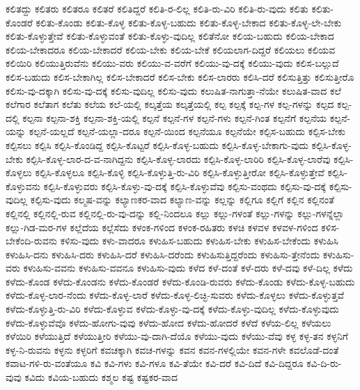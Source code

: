 {ಕಲಿತದ್ದು
ಕಲಿತರು
ಕಲಿತರೂ
ಕಲಿತರೆ
ಕಲಿತಿದ್ದರೆ
ಕಲಿತಿ-ರ-ಲಿಲ್ಲ
ಕಲಿತಿ-ರು-ವಿರಿ
ಕಲಿತಿ-ರು-ವುದು
ಕಲಿತು
ಕಲಿತು-ಕೊಂಡರೆ
ಕಲಿತು-ಕೊಂಡು
ಕಲಿತು-ಕೊಳ್ಳ
ಕಲಿತು-ಕೊಳ್ಳ-ಬಹುದು
ಕಲಿತು-ಕೊಳ್ಳ-ಬೇಕಾದ
ಕಲಿತು-ಕೊಳ್ಳ-ಲೇ-ಬೇಕು
ಕಲಿತು-ಕೊಳ್ಳುತ್ತೇವೆ
ಕಲಿತು-ಕೊಳ್ಳುವಂತೆ
ಕಲಿತು-ಕೊಳ್ಳು-ವುದಿಲ್ಲ
ಕಲಿತೆನೋ
ಕಲಿಯ-ಬಹುದು
ಕಲಿಯ-ಬೇಕಾದ
ಕಲಿಯ-ಬೇಕಾದರೂ
ಕಲಿಯ-ಬೇಕಾದರೆ
ಕಲಿಯ-ಬೇಕು
ಕಲಿಯ-ಬೇಕೆ
ಕಲಿಯಲಾಗ-ದಿದ್ದರೆ
ಕಲಿಯಲು
ಕಲಿಯವ
ಕಲಿಯಿರಿ
ಕಲಿಯುತ್ತಿರುವೆನು
ಕಲಿಯು-ವರು
ಕಲಿಯು-ವ-ವರೆಗೆ
ಕಲಿಯು-ವು-ದಕ್ಕೆ
ಕಲಿಯು-ವುದು
ಕಲಿಸ-ಬಲ್ಲುದೆ
ಕಲಿಸ-ಬಹುದು
ಕಲಿಸ-ಬೇಕಾಗಿಲ್ಲ
ಕಲಿಸ-ಬೇಕಾದರೆ
ಕಲಿಸ-ಬೇಕು
ಕಲಿಸ-ಲಾರರು
ಕಲಿಸಿ-ದರೆ
ಕಲಿಸುತ್ತಿತ್ತು
ಕಲಿಸುತ್ತೀರೊ
ಕಲಿಸು-ವು-ದಕ್ಕಾಗಿ
ಕಲಿಸು-ವು-ದಕ್ಕೆ
ಕಲಿಸು-ವುದಿಲ್ಲ
ಕಲಿಸು-ವುದು
ಕಲುಷಿತ-ನಾಗುತ್ತಾ-ನೆಯೇ
ಕಲುಷಿತ-ವಾದ
ಕಲೆ
ಕಲೆಗಾರ
ಕಲೆತಾಗ
ಕಲೆತು
ಕಲೆಯ
ಕಲೆ-ಯಲ್ಲಿ
ಕಲ್ಕತ್ತೆಯ
ಕಲ್ಕತ್ತೆಯಲ್ಲಿ
ಕಲ್ಪ
ಕಲ್ಪಕ್ಕೆ
ಕಲ್ಪ-ಗಳ
ಕಲ್ಪ-ಗಳನ್ನು
ಕಲ್ಪದ
ಕಲ್ಪ-ದಲ್ಲಿ
ಕಲ್ಪನಾ
ಕಲ್ಪನಾ-ಶಕ್ತಿ
ಕಲ್ಪನಾ-ಶಕ್ತಿ-ಯಲ್ಲಿ
ಕಲ್ಪನೆ
ಕಲ್ಪನೆ-ಗಳ
ಕಲ್ಪನೆ-ಗಳು
ಕಲ್ಪನೆ-ಗಿಂತ
ಕಲ್ಪನೆಗೆ
ಕಲ್ಪನೆಯ
ಕಲ್ಪನೆ-ಯನ್ನು
ಕಲ್ಪನೆ-ಯಲ್ಲದೆ
ಕಲ್ಪನೆ-ಯಲ್ಲಾ-ದರೂ
ಕಲ್ಪನೆ-ಯಿಂದ
ಕಲ್ಪನೆಯೂ
ಕಲ್ಪನೆಯೇ
ಕಲ್ಪಿಸ-ಬಹುದು
ಕಲ್ಪಿಸ-ಬೇಕು
ಕಲ್ಪಿಸಲು
ಕಲ್ಪಿಸಿ
ಕಲ್ಪಿಸಿ-ಕೊಂಡಿದ್ದ
ಕಲ್ಪಿಸಿ-ಕೊಟ್ಟರೆ
ಕಲ್ಪಿಸಿ-ಕೊಳ್ಳ-ಬಹುದು
ಕಲ್ಪಿಸಿ-ಕೊಳ್ಳ-ಬೇಕಾಗು-ವುದು
ಕಲ್ಪಿಸಿ-ಕೊಳ್ಳ-ಬೇಕು
ಕಲ್ಪಿಸಿ-ಕೊಳ್ಳ-ಲಾರ-ದ-ವ-ನಾಗಿದ್ದನು
ಕಲ್ಪಿಸಿ-ಕೊಳ್ಳ-ಲಾರದು
ಕಲ್ಪಿಸಿ-ಕೊಳ್ಳ-ಲಾರಿರಿ
ಕಲ್ಪಿಸಿ-ಕೊಳ್ಳ-ಲಾರೆವು
ಕಲ್ಪಿಸಿ-ಕೊಳ್ಳಲು
ಕಲ್ಪಿಸಿ-ಕೊಳ್ಳಲೂ
ಕಲ್ಪಿಸಿ-ಕೊಳ್ಳಿ
ಕಲ್ಪಿಸಿ-ಕೊಳ್ಳುತ್ತಿ-ರು-ವಿರಿ
ಕಲ್ಪಿಸಿ-ಕೊಳ್ಳುತ್ತೀರೋ
ಕಲ್ಪಿಸಿ-ಕೊಳ್ಳುತ್ತೇವೆ
ಕಲ್ಪಿಸಿ-ಕೊಳ್ಳುವನು
ಕಲ್ಪಿಸಿ-ಕೊಳ್ಳುವರು
ಕಲ್ಪಿಸಿ-ಕೊಳ್ಳು-ವು-ದಕ್ಕೆ
ಕಲ್ಪಿಸಿ-ಕೊಳ್ಳುವೆವು
ಕಲ್ಪಿಸು-ವಂಥದು
ಕಲ್ಪಿಸು-ವು-ದಕ್ಕೆ
ಕಲ್ಪಿಸು-ವುದಿಲ್ಲ
ಕಲ್ಪಿಸು-ವುದು
ಕಲ್ಮಷ-ವನ್ನು
ಕಲ್ಯಾಣಕರ-ವಾದ
ಕಲ್ಯಾಣ-ವನ್ನು
ಕಲ್ಲನ್ನು
ಕಲ್ಲಿಗೂ
ಕಲ್ಲಿಗೆ
ಕಲ್ಲಿನ
ಕಲ್ಲಿನಂತೆ
ಕಲ್ಲಿನಲ್ಲಿ
ಕಲ್ಲಿನಲ್ಲಿ-ರುವ
ಕಲ್ಲಿನಲ್ಲಿ-ರು-ವು-ದನ್ನು
ಕಲ್ಲಿ-ನಿಂದಲೂ
ಕಲ್ಲು
ಕಲ್ಲು-ಗಳಂತೆ
ಕಲ್ಲು-ಗಳನ್ನು
ಕಲ್ಲು-ಗಳನ್ನೆಲ್ಲಾ
ಕಲ್ಲು-ಗಿಡ-ಮರ-ಗಳ
ಕಲ್ಲೆದೆಯ
ಕಲ್ಲೆಸೆದು
ಕಳಂಕ-ಗಳಿಂದ
ಕಳಂಕ-ರಹಿತರು
ಕಳಚಿ
ಕಳವಳ
ಕಳವಳ-ಗಳಿಂದ
ಕಳಿಸ-ಬೇಕೆಂದಿ-ರುವನು
ಕಳಿಸು-ವುದು
ಕಳು-ವಾದರೂ
ಕಳುಹಿಸ-ಬಹುದು
ಕಳುಹಿಸ-ಬೇಕು
ಕಳುಹಿಸ-ಬೇಕೆಂದು
ಕಳುಹಿಸಿ
ಕಳುಹಿಸಿ-ದನು
ಕಳುಹಿಸಿ-ದರು
ಕಳುಹಿಸಿ-ದರೆ
ಕಳುಹಿಸಿ-ದರೆಂದು
ಕಳುಹಿಸುತ್ತಿದ್ದರೆಂದು
ಕಳುಹಿಸು-ತ್ತೇನೆಂದು
ಕಳುಹಿಸು-ವರು
ಕಳುಹಿಸು-ವವನು
ಕಳುಹಿಸು-ವವನೂ
ಕಳುಹಿಸು-ವುದು
ಕಳೆದ
ಕಳೆ-ದಂತೆ
ಕಳೆ-ದರು
ಕಳೆ-ದವು
ಕಳೆ-ದಿಲ್ಲ
ಕಳೆದು
ಕಳೆದು-ಕೊಂಡ
ಕಳೆದು-ಕೊಂಡನು
ಕಳೆದು-ಕೊಂಡರೆ
ಕಳೆದು-ಕೊಂಡಿ-ರುವರು
ಕಳೆದು-ಕೊಂಡು
ಕಳೆದು-ಕೊಳ್ಳ-ಬಹುದು
ಕಳೆದು-ಕೊಳ್ಳ-ಲಾರ-ನೆಂದು
ಕಳೆದು-ಕೊಳ್ಳ-ಲಾರೆ
ಕಳೆದು-ಕೊಳ್ಳ-ಲಿಚ್ಛಿ-ಸುವರು
ಕಳೆದು-ಕೊಳ್ಳಲು
ಕಳೆದು-ಕೊಳ್ಳುತ್ತವೆ
ಕಳೆದು-ಕೊಳ್ಳುತ್ತಿ-ರು-ವಿರಿ
ಕಳೆದು-ಕೊಳ್ಳುವ
ಕಳೆದು-ಕೊಳ್ಳು-ವು-ದಕ್ಕೆ
ಕಳೆದು-ಕೊಳ್ಳು-ವುದಿಲ್ಲ
ಕಳೆದು-ಕೊಳ್ಳುವುದು
ಕಳೆದು-ಕೊಳ್ಳುವೆವೊ
ಕಳೆದು-ಹೋಗು-ವುವು
ಕಳೆದು-ಹೋದ
ಕಳೆದು-ಹೋದರೆ
ಕಳೆದೆ
ಕಳೆಯ-ಲಿಲ್ಲ
ಕಳೆಯಲು
ಕಳೆಯಿರಿ
ಕಳೆಯುತ್ತಿದೆ
ಕಳೆಯುತ್ತೀರಿ
ಕಳೆಯು-ವು-ದಾಗಿ-ದೆಯೊ
ಕಳೆಯು-ವುದು
ಕಳೆಯು-ವೆವು
ಕಳ್ಳ
ಕಳ್ಳ-ತನ
ಕಳ್ಳನಿಗೆ
ಕಳ್ಳ-ನಿ-ರುವನು
ಕಳ್ಳನು
ಕಳ್ಳರಿಗೆ
ಕವಚಕ್ಕಾಗಿ
ಕವಚ-ಗಳನ್ನು
ಕವನ
ಕವನ-ಗಳಲ್ಲಿಯೇ
ಕವನ-ಗಳೇ
ಕವಲೊಡೆ-ದಂತೆ
ಕವಾಟ-ಗಳಿ-ರು-ವಂತೆಯೂ
ಕವಿ
ಕವಿ-ಗಳು
ಕವಿ-ಗಳೂ
ಕವಿ-ತೆಯೇ
ಕವಿ-ದರೆ
ಕವಿ-ದಿದೆ
ಕವಿ-ದಿದ್ದರೂ
ಕವಿ-ದಿ-ರು-ವುವು
ಕವಿದು
ಕವಿಯ-ಬಹುದು
ಕಶ್ಮಲ
ಕಷ್ಟ
ಕಷ್ಟಕರ-ವಾದ
}
